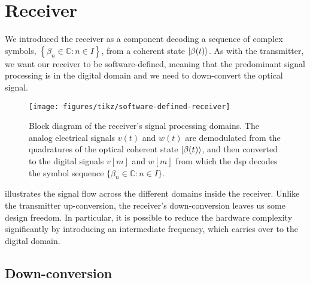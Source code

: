\section{Receiver}
\FloatBarrier

We introduced the receiver as a component decoding a sequence of complex symbols, $\left\{\beta_n\in\mathbb{C}\colon n\in I\right\}$, from a coherent state $\lvert\beta(t)\rangle$.
As with the transmitter, we want our receiver to be software-defined, meaning that the predominant signal processing is in the digital domain and we need to down-convert the optical signal.
\begin{figure}[htb]
	\centering
	\texttt{[image: figures/tikz/software-defined-receiver]}
	\caption{Block diagram of the receiver's signal processing domains. The analog electrical signals $v(t)$ and $w(t)$ are demodulated from the quadratures of the optical coherent state $\lvert\beta(t)\rangle$, and then converted to the digital signals $v[m]$ and $w[m]$ from which the \gls{dsp} decodes the symbol sequence $\{\beta_n\in\mathbb{C}\colon n\in I\}$.}\label{fig:software_defined_receiver}
\end{figure}
 illustrates the signal flow across the different domains inside the receiver.
Unlike the transmitter up-conversion, the receiver's down-conversion leaves us some design freedom.
In particular, it is possible to reduce the hardware complexity significantly by introducing an intermediate frequency, which carries over to the digital domain.

\FloatBarrier
\subsection{Down-conversion}


